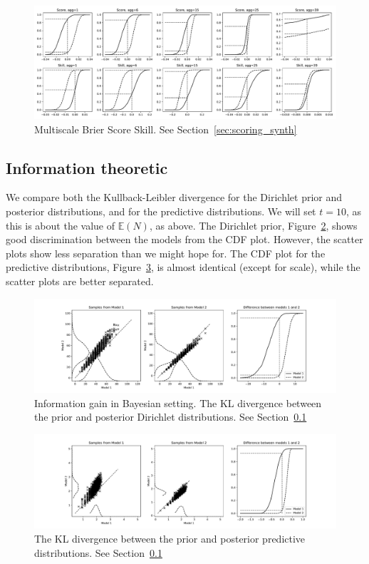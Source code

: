 \documentclass[twoside,a4paper,twocolumn,10pt]{article}
\theoremstyle{plain}
\theoremstyle{definition}
\begin{document}
\begin{figure}
  \includegraphics[width=\textwidth]{../details/brier_agged_synth.pdf}
  \caption{Multiscale Brier Score Skill.  See Section~\ref{sec:scoring_synth}}
   \label{fig:10a}
\end{figure}



\subsection{Information theoretic}\label{sec:bay_synth}

We compare both the Kullback-Leibler divergence for the Dirichlet prior and posterior
distributions, and for the predictive distributions.  We will set $t = 10$, as this is about
the value of $\mathbb E(N)$, as above.  The Dirichlet prior, Figure~\ref{fig:11}, shows
good discrimination between the models from the CDF plot.  However, the scatter plots
show less separation than we might hope for.  The CDF plot for the predictive distributions,
Figure~\ref{fig:11a}, is almost identical (except for scale), while the scatter plots are
better separated.

\begin{figure}
  \includegraphics[width=\textwidth]{../details/bayesian.pdf}
  \caption{Information gain in Bayesian setting.  The KL divergence between the 
prior and posterior Dirichlet distributions.  See Section~\ref{sec:bay_synth}}
   \label{fig:11}
\end{figure}

\begin{figure}
  \includegraphics[width=\textwidth]{../details/bayesian_pred.pdf}
  \caption{The KL divergence between the 
prior and posterior predictive distributions.  See Section~\ref{sec:bay_synth}}
   \label{fig:11a}
\end{figure}
\end{document}
